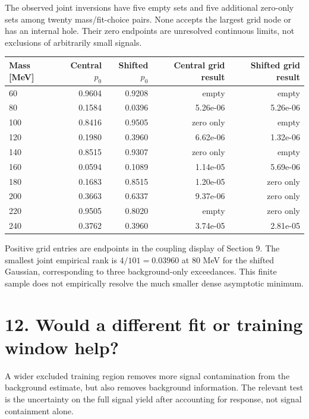 \documentclass[11pt]{article}
\begin{document}
The observed joint inversions have five empty sets and five additional zero-only sets among twenty mass/fit-choice pairs. None accepts the largest grid node or has an internal hole. Their zero endpoints are unresolved continuous limits, not exclusions of arbitrarily small signals.
\begin{center}\small\begin{tabular}{lrrrr}\toprule
Mass [MeV] & Central $p_0$ & Shifted $p_0$ & Central grid result & Shifted grid result\\\midrule
60 & 0.9604 & 0.9208 & empty & empty\\
80 & 0.1584 & 0.0396 & 5.26e-06 & 5.26e-06\\
100 & 0.8416 & 0.9505 & zero only & empty\\
120 & 0.1980 & 0.3960 & 6.62e-06 & 1.32e-06\\
140 & 0.8515 & 0.9307 & zero only & empty\\
160 & 0.0594 & 0.1089 & 1.14e-05 & 5.69e-06\\
180 & 0.1683 & 0.8515 & 1.20e-05 & zero only\\
200 & 0.3663 & 0.6337 & 9.37e-06 & zero only\\
220 & 0.9505 & 0.8020 & empty & zero only\\
240 & 0.3762 & 0.3960 & 3.74e-05 & 2.81e-05\\
\bottomrule\end{tabular}\end{center}
Positive grid entries are endpoints in the coupling display of Section 9. The smallest joint empirical rank is $4/101=0.03960$ at 80 MeV for the shifted Gaussian, corresponding to three background-only exceedances. This finite sample does not empirically resolve the much smaller dense asymptotic minimum.
\clearpage\section*{12. Would a different fit or training window help?}

A wider excluded training region removes more signal contamination from the background estimate, but also removes background information. The relevant test is the uncertainty on the full signal yield after accounting for response, not signal containment alone.
\end{document}
